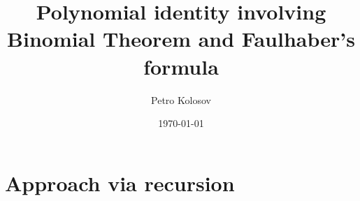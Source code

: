 \documentclass[12pt,letterpaper,oneside,reqno]{amsart}
\title[Polynomial identity involving Binomial Theorem and Faulhaber's formula]
{Polynomial identity involving Binomial Theorem and Faulhaber's formula}
\author[Petro Kolosov]{Petro Kolosov}
\date{\today}
\numberwithin{equation}{section}
\begin{document}
    \maketitle

    \tableofcontents


    \section{Approach via recursion}\label{sec:approach-via-recursion}
    
%
%
%    
%
%
%    
%
%
%    
%
%
%    
%
%
%    
%
%
%    

%    


%    
%
%
%    
%
%
%    


%    
%
%    
%    
\end{document}
